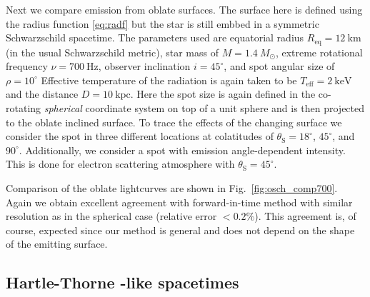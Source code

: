 \documentclass[iop, usenatbib]{emulateapj}
\newcommand{\sch}{Schwarzschild }
\newcommand{\Msun}{\ensuremath{M_{\odot}}}
\begin{document}
Next we compare emission from oblate surfaces.
The surface here is defined using the radius function \eqref{eq:radf} but the star is still embbed in a symmetric \sch spacetime.
The parameters used are equatorial radius $R_{\mathrm{eq}} = 12~\mathrm{km}$ (in the usual \sch metric), star mass of $M = 1.4~\Msun$, extreme rotational frequency $\nu = 700~\mathrm{Hz}$, observer inclination $i=45^{\circ}$, and spot angular size of $\rho = 10^{\circ}$
Effective temperature of the radiation is again taken to be $T_{\mathrm{eff}} = 2~\mathrm{keV}$ and the distance $D = 10~\mathrm{kpc}$.
Here the spot size is again defined in the co-rotating \textit{spherical} coordinate system on top of a unit sphere and is then projected to the oblate inclined surface.
To trace the effects of the changing surface we consider the spot in three different locations at colatitudes of $\theta_{\mathrm{S}} = 18^{\circ}$, $45^{\circ}$, and $90^{\circ}$.
Additionally, we consider a spot with emission angle-dependent intensity.
This is done for electron scattering atmosphere with $\theta_{\mathrm{S}} = 45^{\circ}$.

Comparison of the oblate lightcurves are shown in Fig.~\ref{fig:osch_comp700}.
Again we obtain excellent agreement with forward-in-time method with similar resolution as in the spherical case (relative error $< 0.2\%$).
This agreement is, of course, expected since our method is general and does not depend on the shape of the emitting surface.


\subsection{Hartle-Thorne -like spacetimes}

\end{document}
